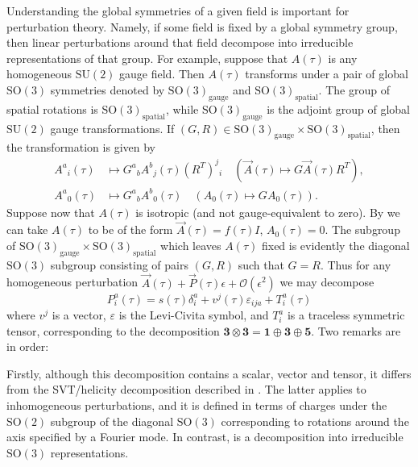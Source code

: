 Understanding the global symmetries of a given field is important for perturbation theory. Namely, if some field is fixed by a global symmetry group, then linear perturbations around that field decompose into irreducible representations of that group. For example, suppose that $A(\tau)$ is any homogeneous $\mathrm{SU}(2)$ gauge field. Then $A(\tau)$ transforms under a pair of global $\mathrm{SO}(3)$ symmetries denoted by $\mathrm{SO}(3)_{\mathrm{gauge}}$ and $\mathrm{SO}(3)_{\mathrm{spatial}}$. The group of spatial rotations is $\mathrm{SO}(3)_{\mathrm{spatial}}$, while $\mathrm{SO}(3)_{\mathrm{gauge}}$ is the adjoint group of global $\mathrm{SU}(2)$ gauge transformations. If $(G,R)\in\mathrm{SO}(3)_{\mathrm{gauge}}\times\mathrm{SO}(3)_{\mathrm{spatial}}$, then the transformation is given by 
\begin{align}
A^{a}{}_{i}(\tau) & \mapsto G^{a}{}_{b}A^{b}{}_{j}(\tau)\left(R^{T}\right)^{j}{}_{i}\quad\left(\vec{A}(\tau)\mapsto G\vec{A}(\tau)R^{T}\right),\label{eq:diagonal-action-space}\\
A^{a}{}_{0}(\tau) & \mapsto G^{a}{}_{b}A^{b}{}_{0}(\tau)\quad\left(A_{0}(\tau)\mapsto GA_{0}(\tau)\right).\label{eq:diagonal-action-time}
\end{align}
Suppose now that $A(\tau)$ is isotropic (and not gauge-equivalent to zero). By  we can take $A(\tau)$ to be of the form $\vec{A}(\tau)=f(\tau)I$, $A_{0}(\tau)=0$. The subgroup of $\mathrm{SO}(3)_{\mathrm{gauge}}\times\mathrm{SO}(3)_{\mathrm{spatial}}$ which leaves $A(\tau)$ fixed is evidently the diagonal $\mathrm{SO}(3)$ subgroup consisting of pairs $(G,R)$ such that $G=R$. Thus for any homogeneous perturbation $\vec{A}(\tau)+\vec{P}(\tau)\epsilon+\mathcal{O}(\epsilon^{2})$ we may decompose 
\begin{equation}
P_{i}^{a}(\tau)=s(\tau)\delta_{i}^{a}+v^{j}(\tau)\varepsilon_{ija}+T_{i}^{a}(\tau)\label{eq:one-three-five}
\end{equation}
 where $v^{j}$ is a vector, $\varepsilon$ is the Levi-Civita symbol, and $T_{i}^{a}$ is a traceless symmetric tensor, corresponding to the decomposition $\mathbf{3}\otimes\mathbf{3}=\mathbf{1}\oplus\mathbf{3}\oplus\mathbf{5}$. Two remarks are in order:

Firstly, although this decomposition contains a scalar, vector and tensor, it differs from the SVT/helicity decomposition described in . The latter applies to inhomogeneous perturbations, and it is defined in terms of charges under the $\mathrm{SO}(2)$ subgroup of the diagonal $\mathrm{SO}(3)$ corresponding to rotations around the axis specified by a Fourier mode. In contrast,  is a decomposition into irreducible $\mathrm{SO}(3)$ representations. 

